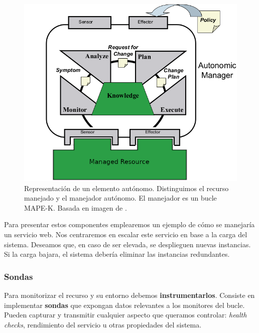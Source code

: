 \begin{figure}[h]
  \centering
  \includegraphics[scale=2]{cap_contexto_tecnologico/images/autonomic-element}
  \caption[Representación de un elemento autónomo. Distinguimos el recurso manejado y el manejador autónomo. El manejador es un bucle MAPE-K (\emph{Monitor}, \emph{Analysis}, \emph{Planification}, \emph{Execution} y \emph{Knowledge})]{Representación de un elemento autónomo. Distinguimos el recurso manejado y el manejador autónomo. El manejador es un bucle MAPE-K. Basada en imagen de \cite{ibmcorporationArchitecturalBlueprintAutonomic2006}.}
  \label{fig:autonomic-element}
\end{figure}

Para presentar estos componentes emplearemos un ejemplo de cómo se manejaría un servicio web. Nos centraremos en escalar este servicio en base a la carga del sistema. Deseamos que, en caso de ser elevada, se desplieguen nuevas instancias. Si la carga bajara, el sistema debería eliminar las instancias redundantes.

\subsubsection{Sondas}

Para monitorizar el recurso y su entorno debemos \textbf{instrumentarlos}. Consiste en implementar \textbf{sondas} que expongan datos relevantes a los monitores del bucle. Pueden capturar y transmitir cualquier aspecto que queramos controlar: \emph{health checks}, rendimiento del servicio u otras propiedades del sistema.

